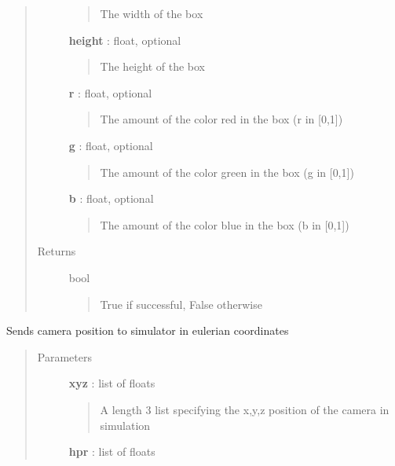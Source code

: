 \documentclass[letterpaper,10pt,english]{sphinxmanual}
\begin{document}
\begin{fulllineitems}
\begin{fulllineitems}
\begin{quote}
\begin{description}
\begin{quote}
The width of the box
\end{quote}

\textbf{height} : float, optional
\begin{quote}

The height of the box
\end{quote}

\textbf{r} : float, optional
\begin{quote}

The amount of the color red in the box (r in {[}0,1{]})
\end{quote}

\textbf{g} : float, optional
\begin{quote}

The amount of the color green in the box (g in {[}0,1{]})
\end{quote}

\textbf{b} : float, optional
\begin{quote}

The amount of the color blue in the box (b in {[}0,1{]})
\end{quote}

\item[{Returns}] \leavevmode
bool
\begin{quote}

True if successful, False otherwise
\end{quote}

\end{description}\end{quote}

\end{fulllineitems}


\begin{fulllineitems}
\label{code:pyrosim.PYROSIM.Send_Camera}
Sends camera position to simulator in eulerian coordinates
\begin{quote}\begin{description}
\item[{Parameters}] \leavevmode
\textbf{xyz} : list of floats
\begin{quote}

A length 3 list specifying the x,y,z position of the camera
in simulation
\end{quote}

\textbf{hpr} : list of floats
\begin{quote}


\end{quote}
\end{description}
\end{quote}
\end{fulllineitems}
\end{fulllineitems}
\end{document}
